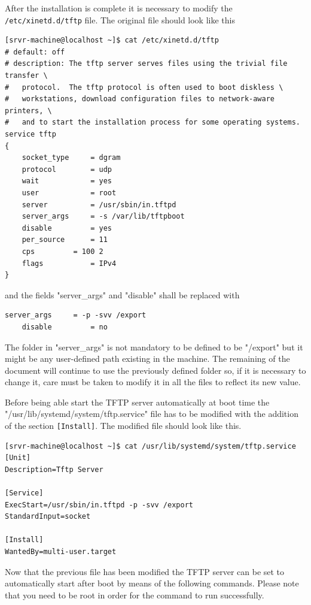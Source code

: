 \documentclass[11pt
  , a4paper
  , article
  , oneside
  , showtrims
]{memoir}
\begin{document}
After the installation is complete it is necessary to modify the \texttt{/etc/xinetd.d/tftp} file. The original file should look like this

\begin{lstlisting}[style=termstyle]
[srvr-machine@localhost ~]$ cat /etc/xinetd.d/tftp
# default: off
# description: The tftp server serves files using the trivial file transfer \
#	protocol.  The tftp protocol is often used to boot diskless \
#	workstations, download configuration files to network-aware printers, \
#	and to start the installation process for some operating systems.
service tftp
{
	socket_type		= dgram
	protocol		= udp
	wait			= yes
	user			= root
	server			= /usr/sbin/in.tftpd
	server_args		= -s /var/lib/tftpboot
	disable			= yes
	per_source		= 11
	cps			= 100 2
	flags			= IPv4
}
\end{lstlisting}

and the fields "server_args" and "disable" shall be replaced with 

\begin{lstlisting}[style=termstyle]
	server_args		= -p -svv /export
	disable			= no
\end{lstlisting}

The folder in "server_args" is not mandatory to be defined to be "/export" but it might be any user-defined path existing in the machine. The remaining of the document will continue to use the previously defined folder so, if it is necessary to change it, care must be taken to modify it in all the files to reflect its new value.

Before being able start the TFTP server automatically at boot time the "/usr/lib/systemd/system/tftp.service" file has to be modified with the addition of the section \texttt{[Install]}. The modified file should look like this.

\begin{lstlisting}[style=termstyle]
[srvr-machine@localhost ~]$ cat /usr/lib/systemd/system/tftp.service 
[Unit]
Description=Tftp Server

[Service]
ExecStart=/usr/sbin/in.tftpd -p -svv /export
StandardInput=socket

[Install]
WantedBy=multi-user.target
\end{lstlisting}

Now that the previous file has been modified the TFTP server can be set to automatically start after boot by means of the following commands. Please note that you need to be root in order for the command to run successfully.
\end{document}
